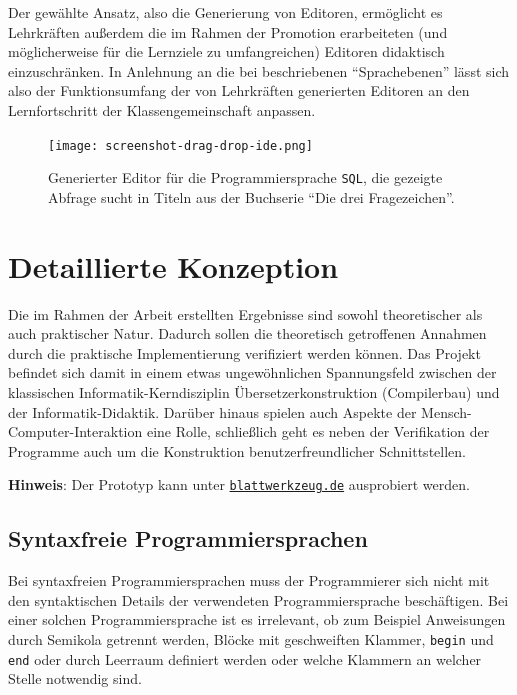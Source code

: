 \documentclass[paper=a4,fontsize=11pt,parskip=half]{scrartcl}
\begin{document}
Der gewählte Ansatz, also die Generierung von Editoren, ermöglicht es Lehrkräften außerdem die im Rahmen der Promotion erarbeiteten (und möglicherweise für die Lernziele zu umfangreichen) Editoren didaktisch einzuschränken. In Anlehnung an die bei \cite{klaeren_macht_2007} beschriebenen \enquote{Sprachebenen} lässt sich also der Funktionsumfang der von Lehrkräften generierten Editoren an den Lernfortschritt der Klassengemeinschaft anpassen.

\begin{figure}[h]
  \centering\texttt{[image: screenshot-drag-drop-ide.png]}
  \caption{Generierter Editor für die Programmiersprache \texttt{SQL}, die gezeigte Abfrage sucht in Titeln aus der Buchserie \enquote{Die drei Fragezeichen}.}
  \label{fig:example-sql-ide}
\end{figure}

\clearpage

\restoregeometry
\pagestyle{plain}

\section{Detaillierte Konzeption}

Die im Rahmen der Arbeit erstellten Ergebnisse sind sowohl theoretischer als auch praktischer Natur. Dadurch sollen die theoretisch getroffenen Annahmen durch die praktische Implementierung verifiziert werden können. Das Projekt befindet sich damit in einem etwas ungewöhnlichen Spannungsfeld zwischen der klassischen Informatik-Kerndisziplin Übersetzerkonstruktion (Compilerbau) und der Informatik-Didaktik. Darüber hinaus spielen auch Aspekte der Mensch-Computer-Interaktion eine Rolle, schließlich geht es neben der Verifikation der Programme auch um die Konstruktion benutzerfreundlicher Schnittstellen.

\begin{framed}
  \textbf{Hinweis}: Der Prototyp kann unter \href{https://blattwerkzeug.de}{\texttt{blattwerkzeug.de}} ausprobiert werden.
\end{framed}

\subsection{Syntaxfreie Programmiersprachen}

Bei syntaxfreien Programmiersprachen muss der Programmierer sich nicht mit den syntaktischen Details der verwendeten Programmiersprache beschäftigen. Bei einer solchen Programmiersprache ist es irrelevant, ob zum Beispiel Anweisungen durch Semikola getrennt werden, Blöcke mit geschweiften Klammer, \texttt{begin} und \texttt{end} oder durch Leerraum definiert werden oder welche Klammern an welcher Stelle notwendig sind.
\end{document}
